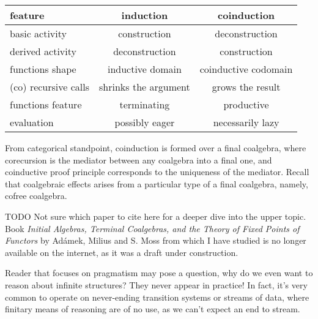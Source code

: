 \documentclass[declaration,shortabstract]{iithesis}
\theoremstyle{definition} \newtheorem{definition}{Definition}[chapter]
\theoremstyle{remark} \newtheorem{remark}[definition]{Observation}
\theoremstyle{plain} \newtheorem{theorem}[definition]{Theorem}
\theoremstyle{plain} \newtheorem{lemma}[definition]{Lemma}
\begin{document}
    \begin{center}
    \begin{tabular}{lcc}
    \toprule

    \textbf{feature}             & \textbf{induction}            & \textbf{coinduction}          \\
    \midrule

    basic activity      & construction          & deconstruction \\
    \midrule

    derived activity    & deconstruction       & construction         \\
    \midrule

    functions shape     & inductive domain     & coinductive codomain \\
    \midrule

    (co) recursive calls& shrinks the argument & grows the result     \\
    \midrule

    functions feature   & terminating          & productive           \\
    \midrule

    evaluation          & possibly eager       & necessarily lazy     \\
    \bottomrule

    \end{tabular}
    \end{center}

    From categorical standpoint, coinduction is formed over a final coalgebra,
    where corecursion is the mediator between any coalgebra into a final one,
    and coinductive proof principle corresponds to the uniqueness of the mediator.
    Recall that coalgebraic effects arises from a particular type of a final
    coalgebra, namely, cofree coalgebra.

    \noindent
    TODO Not sure which paper to cite here for a deeper dive into the upper
    topic. Book \textit{Initial Algebras, Terminal Coalgebras, and the Theory of Fixed Points of Functors}
    by Adámek, Milius and S. Moss from which I have studied is no longer available
    on the internet, as it was a draft under construction.

    Reader that focuses on pragmatism may pose a question, why do we even want
    to reason about infinite structures? They never appear in practice! In fact,
    it's very common to operate on never-ending transition systems or streams of
    data, where finitary means of reasoning are of no use, as we can’t expect
    an end to stream.
\end{document}
